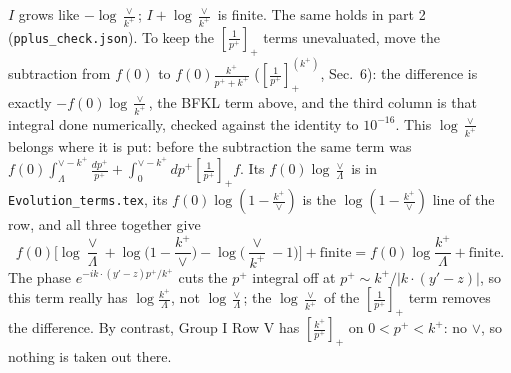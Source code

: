 \documentclass[9pt]{article}
\numberwithin{equation}{section}
\begin{document}
$I$ grows like $-\log\frac{\vee}{k^+}$; $I+\log\frac{\vee}{k^+}$ is finite. The same holds in part 2 (\texttt{pplus\_check.json}). To keep the $\left[\frac{1}{p^+}\right]_+$ terms unevaluated, move the subtraction from $f(0)$ to $f(0)\frac{k^+}{p^++k^+}$ ($\left[\frac{1}{p^+}\right]_+^{(k^+)}$, Sec.~6): the difference is exactly $-f(0)\log\frac{\vee}{k^+}$, the BFKL term above, and the third column is that integral done numerically, checked against the identity to $10^{-16}$. This $\log\frac{\vee}{k^+}$ belongs where it is put: before the subtraction the same term was $f(0)\int_\Lambda^{\vee-k^+}\frac{dp^+}{p^+}+\int_0^{\vee-k^+}dp^+\left[\frac{1}{p^+}\right]_+f$. Its $f(0)\log\frac{\vee}{\Lambda}$ is in \texttt{Evolution\_terms.tex}, its $f(0)\log(1-\frac{k^+}{\vee})$ is the $\log(1-\frac{k^+}{\vee})$ line of the row, and all three together give
\begin{equation*}
f(0)\Big[\log\frac{\vee}{\Lambda}+\log\Big(1-\frac{k^+}{\vee}\Big)-\log\Big(\frac{\vee}{k^+}-1\Big)\Big]+\text{finite}=f(0)\log\frac{k^+}{\Lambda}+\text{finite}.
\end{equation*}
The phase $e^{-ik\cdot(y'-z)p^+/k^+}$ cuts the $p^+$ integral off at $p^+\sim k^+/|k\cdot(y'-z)|$, so this term really has $\log\frac{k^+}{\Lambda}$, not $\log\frac{\vee}{\Lambda}$; the $\log\frac{\vee}{k^+}$ of the $\left[\frac{1}{p^+}\right]_+$ term removes the difference. By contrast, Group I Row V has $\left[\frac{k^+}{p^+}\right]_+$ on $0<p^+<k^+$: no $\vee$, so nothing is taken out there.
\end{document}

